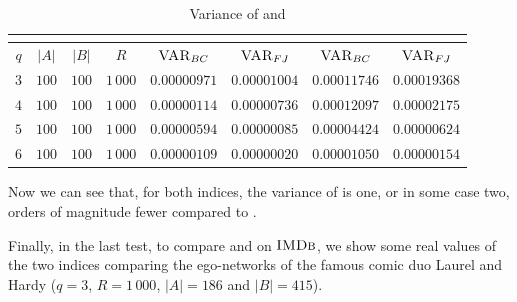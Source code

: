 \begin{table}[h]
	\centering
	\begin{tabular}{|c|c|c|c|c|c|c|c|}
		\cline{5-8}
		\multicolumn{4}{c|}{} & \multicolumn{2}{c|}{\fsamp} & \multicolumn{2}{c|}{\base}\\
		\hline
		$q$ & $|A|$ & $|B|$ & $R$      & $\textsc{VAR}_{BC}$ & $\textsc{VAR}_{FJ}$ & $\textsc{VAR}_{BC}$ & $\textsc{VAR}_{FJ}$ \\ \hline 
		$3$ & $100$ & $100$ & $1\,000$ & $0.00000971$        & $0.00001004$        & $0.00011746$        & $0.00019368$        \\ \hline
		$4$ & $100$ & $100$ & $1\,000$ & $0.00000114$        & $0.00000736$        & $0.00012097$        & $0.00002175$        \\ \hline
		$5$ & $100$ & $100$ & $1\,000$ & $0.00000594$        & $0.00000085$        & $0.00004424$        & $0.00000624$        \\ \hline
		$6$ & $100$ & $100$ & $1\,000$ & $0.00000109$        & $0.00000020$        & $0.00001050$        & $0.00000154$        \\ \hline
	\end{tabular}
	\caption{Variance of \fsamp and \base}	
\end{table}

Now we can see that, for both indices, the variance of \fsamp is one, or in some case two, orders of magnitude fewer compared to \base.

Finally, in the last test, to compare \fsamp and \base on $\textsc{IMDb}$, we show some real values of the two indices comparing the ego-networks of the famous comic duo Laurel and Hardy
($q=3$, $R=1\,000$, $|A| = 186$ and $|B| = 415$).

